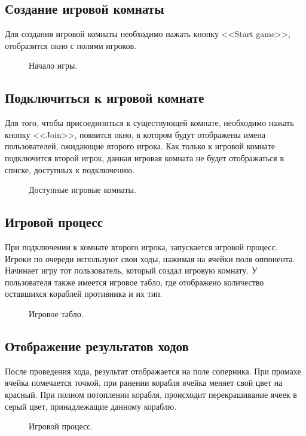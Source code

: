 \documentclass{article}
\begin{document}
		\subsection{Создание игровой комнаты}
			Для создания игровой комнаты необходимо нажать кнопку <<Start game>>, отобразится окно с полями игроков.
			\begin{figure}[H]
				\caption{Начало игры.\label{field}}
			\end{figure}
		\subsection{Подключиться к игровой комнате}
			Для того, чтобы присоединиться к существующей комнате, необходимо нажать кнопку <<Join>>, появится окно, в котором будут отображены имена пользователей, ожидающие второго игрока. Как только к игровой комнате подключится второй игрок, данная игровая комната не будет отображаться в списке, доступных к подключению.
			\begin{figure}[H]
				\caption{Доступные игровые комнаты.\label{lobbies}}
			\end{figure}
		\subsection{Игровой процесс}
			При подключении к комнате второго игрока, запускается игровой процесс. Игроки по очереди используют свои ходы, нажимая на ячейки поля оппонента. Начинает игру тот пользователь, который создал игровую комнату. У пользователя также имеется игровое табло, где отображено количество оставшихся кораблей противника и их тип.
			\begin{figure}[H]
				\caption{Игровое табло.\label{scoreboard}}
			\end{figure}
		\subsection{Отображение результатов ходов}
			После проведения хода, результат отображается на поле соперника. При промахе ячейка помечается точкой, при ранении корабля ячейка меняет свой цвет на красный. При полном потоплении корабля, происходит перекрашивание ячеек в серый цвет, принадлежащие данному кораблю.
			\begin{figure}[H]
				\caption{Игровой процесс.\label{playprocess}}
			\end{figure}
\end{document}
